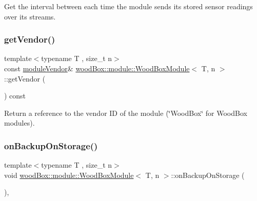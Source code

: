 Get the interval between each time the module sends its stored sensor readings over its streams. \mbox{\label{classwood_box_1_1module_1_1_wood_box_module_a2d3f18ce3df3d5fe3b6230fce2199958}} 
\subsubsection{\texorpdfstring{get\+Vendor()}{getVendor()}}
{\footnotesize\ttfamily template$<$typename T , size\+\_\+t n$>$ \\
const \mbox{\hyperlink{classwood_box_1_1module_1_1_wood_box_module_adf5d59bae2980ff138284d0fa885df19}{module\+Vendor}}\& \mbox{\hyperlink{classwood_box_1_1module_1_1_wood_box_module}{wood\+Box\+::module\+::\+Wood\+Box\+Module}}$<$ T, n $>$\+::get\+Vendor (\begin{DoxyParamCaption}{ }\end{DoxyParamCaption}) const\hspace{0.3cm}{\ttfamily [inline]}}

Return a reference to the vendor ID of the module (\char`\"{}\+Wood\+Box\char`\"{} for Wood\+Box modules). \mbox{\label{classwood_box_1_1module_1_1_wood_box_module_a28c9b89bc3429d6e78fa38698c78d553}} 
\subsubsection{\texorpdfstring{on\+Backup\+On\+Storage()}{onBackupOnStorage()}}
{\footnotesize\ttfamily template$<$typename T , size\+\_\+t n$>$ \\
void \mbox{\hyperlink{classwood_box_1_1module_1_1_wood_box_module}{wood\+Box\+::module\+::\+Wood\+Box\+Module}}$<$ T, n $>$\+::on\+Backup\+On\+Storage (\begin{DoxyParamCaption}{ }\end{DoxyParamCaption})\hspace{0.3cm}{\ttfamily [inline]}, {\ttfamily [protected]}}

